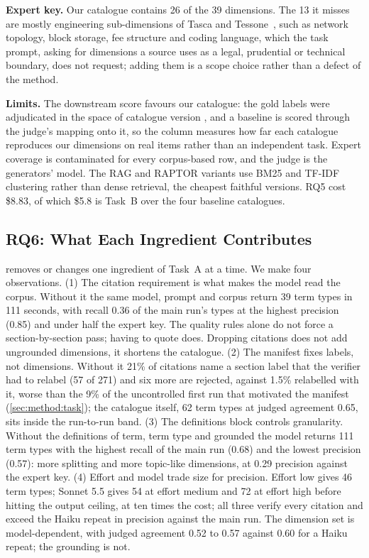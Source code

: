 \textbf{Expert key.} Our catalogue contains 26 of the 39 dimensions. The 13
it misses are mostly engineering sub-dimensions of Tasca and
Tessone~\cite{tasca2019taxonomy}, such as network topology, block storage,
fee structure and coding language, which the task prompt, asking for
dimensions a source uses as a legal, prudential or technical boundary, does
not request; adding them is a scope choice rather than a defect of the
method.

\textbf{Limits.} The downstream score favours our catalogue: the gold labels
were adjudicated in the space of catalogue version \EvalCat, and a baseline is
scored through the judge's mapping onto it, so the column measures how far
each catalogue reproduces our dimensions on real items rather than an
independent task. Expert coverage is contaminated for every corpus-based row,
and the judge is the generators' model. The RAG and RAPTOR variants use BM25
and TF-IDF clustering rather than dense retrieval, the cheapest faithful
versions. RQ5 cost \$8.83, of which \$5.8 is Task~B over the four baseline
catalogues.

\subsection{RQ6: What Each Ingredient Contributes}
\label{sec:exp:rq6}

 removes or changes one ingredient of Task~A at a time. We make
four observations. (1) The citation requirement is what makes the model read
the corpus. Without it the same model, prompt and corpus return 39 term
types in 111 seconds, with recall 0.36 of the main run's types at the
highest precision (0.85) and under half the expert key. The quality rules
alone do not force a section-by-section pass; having to quote does. Dropping
citations does not add ungrounded dimensions, it shortens the catalogue.
(2) The manifest fixes labels, not dimensions. Without it 21\% of citations
name a section label that the verifier had to relabel (57 of 271) and six
more are rejected, against 1.5\% relabelled with it, worse than the 9\% of
the uncontrolled first run that motivated the manifest
(\cref{sec:method:task}); the catalogue itself, 62 term types at judged
agreement 0.65, sits inside the run-to-run band. (3) The definitions block
controls granularity. Without the definitions of term, term type and grounded
the model returns 111 term types with the highest recall of the main run
(0.68) and the lowest precision (0.57): more splitting and more topic-like
dimensions, at 0.29 precision against the expert key. (4) Effort and model
trade size for precision. Effort low gives 46 term types; Sonnet 5.5 gives
54 at effort medium and 72 at effort high before hitting the output ceiling,
at ten times the cost; all three verify every citation and exceed the Haiku
repeat in precision against the main run. The dimension set is
model-dependent, with judged agreement 0.52 to 0.57 against 0.60 for a Haiku
repeat; the grounding is not.


